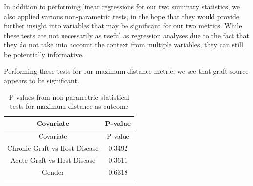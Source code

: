 \documentclass[12pt,twoside]{dukestatscithesis}
\begin{document}
In addition to performing linear regressions for our two summary
statistics, we also applied various non-parametric tests, in the hope
that they would provide further insight into variables that may be
significant for our two metrics. While these tests are not necessarily
as useful as regression analyses due to the fact that they do not take
into account the context from multiple variables, they can still be
potentially informative.

Performing these tests for our maximum distance metric, we see that
graft source appears to be significant.
\begin{longtable}[]{@{}cc@{}}
\caption{P-values from non-parametric statistical tests for maximum
distance as outcome}\tabularnewline
\toprule
\begin{minipage}[b]{0.54\columnwidth}\centering\strut
Covariate\strut
\end{minipage} & \begin{minipage}[b]{0.30\columnwidth}\centering\strut
P-value\strut
\end{minipage}\tabularnewline
\midrule
\endfirsthead
\toprule
\begin{minipage}[b]{0.54\columnwidth}\centering\strut
Covariate\strut
\end{minipage} & \begin{minipage}[b]{0.30\columnwidth}\centering\strut
P-value\strut
\end{minipage}\tabularnewline
\midrule
\endhead
\begin{minipage}[t]{0.54\columnwidth}\centering\strut
Chronic Graft vs Host Disease\strut
\end{minipage} & \begin{minipage}[t]{0.30\columnwidth}\centering\strut
0.3492\strut
\end{minipage}\tabularnewline
\begin{minipage}[t]{0.54\columnwidth}\centering\strut
Acute Graft vs Host Disease\strut
\end{minipage} & \begin{minipage}[t]{0.30\columnwidth}\centering\strut
0.3611\strut
\end{minipage}\tabularnewline
\begin{minipage}[t]{0.54\columnwidth}\centering\strut
Gender\strut
\end{minipage} & \begin{minipage}[t]{0.30\columnwidth}\centering\strut
0.6318\strut
\end{minipage}\tabularnewline
\begin{minipage}[t]{0.54\columnwidth}\centering\strut

\end{minipage}
\end{longtable}
\end{document}
